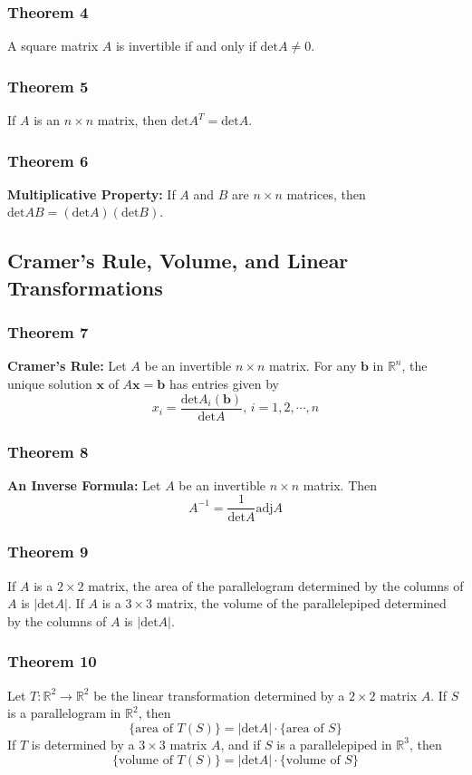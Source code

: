 \documentclass[letterpaper,11pt]{article}
\begin{document}
			\subsubsection{Theorem 4}
				A square matrix $A$ is invertible if and only if $\textrm{det}A\neq 0$.
			\subsubsection{Theorem 5}
				If $A$ is an $n\times n$ matrix, then $\textrm{det}A^T=\textrm{det}A$.
			\subsubsection{Theorem 6}
				\textbf{Multiplicative Property:} If $A$ and $B$ are $n\times n$ matrices, then $\textrm{det}AB=(\textrm{det}A)(\textrm{det}B)$.
		\subsection{Cramer's Rule, Volume, and Linear Transformations}
			\subsubsection{Theorem 7}
				\textbf{Cramer's Rule:} Let $A$ be an invertible $n\times n$ matrix. For any $\mathbf{b}$ in $\mathbb{R}^n$, the unique solution $\mathbf{x}$ of $A\mathbf{x}=\mathbf{b}$ has entries given by
				\begin{equation}
					x_i=\frac{\textrm{det}A_i(\mathbf{b})}{\textrm{det}A}\textrm{, }i=1,2,\cdots,n
				\end{equation}
			\subsubsection{Theorem 8}
				\textbf{An Inverse Formula:} Let $A$ be an invertible $n\times n$ matrix. Then
				\begin{equation}
					A^{-1}=\frac{1}{\textrm{det}A}\textrm{adj}A
				\end{equation}
			\subsubsection{Theorem 9}
				If $A$ is a $2\times 2$ matrix, the area of the parallelogram determined by the columns of $A$ is $|\textrm{det}A|$. If $A$ is a $3\times 3$ matrix, the volume of the parallelepiped determined by the columns of $A$ is $|\textrm{det}A|$.
			\subsubsection{Theorem 10}
				Let $T:\mathbb{R}^2\rightarrow\mathbb{R}^2$ be the linear transformation determined by a $2\times 2$ matrix $A$. If $S$ is a parallelogram in $\mathbb{R}^2$, then
				\begin{equation}
					\{\textrm{area of }T(S)\}=|\textrm{det}A|\cdot\{\textrm{area of }S\}
				\end{equation}
				If $T$ is determined by a $3\times 3$ matrix $A$, and if $S$ is a parallelepiped in $\mathbb{R}^3$, then
				\begin{equation}
					\{\textrm{volume of }T(S)\}=|\textrm{det}A|\cdot\{\textrm{volume of }S\}
				\end{equation}
\end{document}
